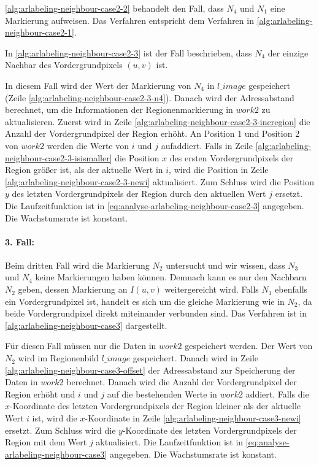 \autoref{alg:arlabeling-neighbour-case2-2} behandelt den Fall, dass $N_4$ und $N_1$ eine Markierung aufweisen. Das Verfahren entspricht dem Verfahren in \autoref{alg:arlabeling-neighbour-case2-1}.


In \autoref{alg:arlabeling-neighbour-case2-3} ist der Fall beschrieben, dass $N_4$ der einzige Nachbar des
 Vordergrundpixels $(u,v)$ ist.

In diesem Fall wird der Wert der Markierung von $N_4$ in $\mathit{l\_image}$ gespeichert
 (Zeile \ref{alg:arlabeling-neighbour-case2-3-n4}). Danach wird der Adressabstand berechnet, um die Informationen der
 Regionenmarkierung in $\mathit{work2}$ zu aktualisieren. Zuerst wird in Zeile
 \ref{alg:arlabeling-neighbour-case2-3-incregion} die Anzahl der Vordergrundpixel der Region erhöht. An Position 1 und
 Position 2 von $\mathit{work2}$ werden die Werte von $i$ und $j$ aufaddiert. Falls in Zeile
 \ref{alg:arlabeling-neighbour-case2-3-isismaller} die Position $x$ des ersten Vordergrundpixels der Region größer ist,
 als der aktuelle Wert in $i$, wird die Position in Zeile \ref{alg:arlabeling-neighbour-case2-3-newi} aktualisiert. Zum
 Schluss wird die Position $y$ des letzten Vordergrundpixels der Region durch den aktuellen Wert $j$ ersetzt. Die
 Laufzeitfunktion ist in \autoref{eq:analyse-arlabeling-neighbour-case2-3} angegeben. Die Wachstumsrate ist konstant.


\paragraph{3. Fall:} %
\label{par:fall_3_}
Beim dritten Fall wird die Markierung $N_2$ untersucht und wir wissen, dass $N_3$ und $N_4$ keine Markierungen haben
 können. Demnach kann es nur den Nachbarn $N_2$ geben, dessen Markierung an $I(u,v)$ weitergereicht wird. Falls $N_1$
 ebenfalls ein Vordergrundpixel ist, handelt es sich um die gleiche Markierung wie in $N_2$, da beide Vordergrundpixel
 direkt miteinander verbunden sind. Das Verfahren ist in \autoref{alg:arlabeling-neighbour-case3} dargestellt.

Für diesen Fall müssen nur die Daten in $\mathit{work2}$ gespeichert werden. Der Wert von $N_2$ wird im Regionenbild
 $\mathit{l\_image}$ gespeichert. Danach wird in Zeile \ref{alg:arlabeling-neighbour-case3-offset} der Adressabstand
 zur Speicherung der Daten in $\mathit{work2}$ berechnet. Danach wird die Anzahl der Vordergrundpixel der Region erhöht
 und $i$ und $j$ auf die bestehenden Werte in $\mathit{work2}$ addiert. Falls die $x$-Koordinate des letzten
 Vordergrundpixels der Region kleiner als der aktuelle Wert $i$ ist, wird die $x$-Koordinate in Zeile
 \ref{alg:arlabeling-neighbour-case3-newi} ersetzt. Zum Schluss wird die $y$-Koordinate des letzten Vordergrundpixels
 der Region mit dem Wert $j$ aktualisiert. Die Laufzeitfunktion ist in \autoref{eq:analyse-arlabeling-neighbour-case3}
 angegeben. Die Wachstumsrate ist konstant.


